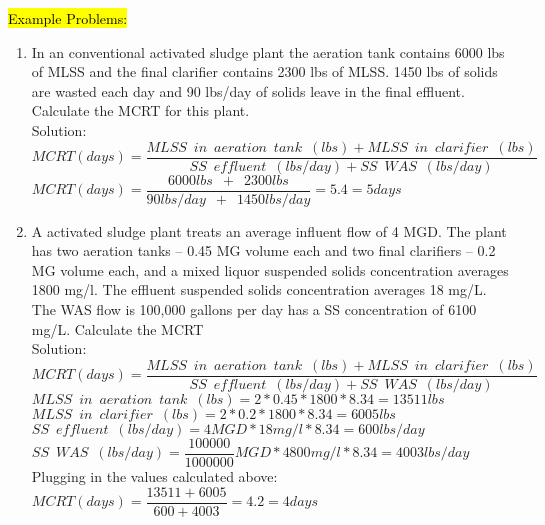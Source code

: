 \hl{Example Problems:}\\
\begin{enumerate}
\item In an conventional activated sludge plant  the aeration tank contains 6000 lbs of MLSS and the final clarifier contains 2300 lbs of MLSS. 1450 lbs of solids are wasted each day and 90 lbs/day of solids leave in the final effluent. Calculate the MCRT for this plant.\\
Solution:\\
\vspace{0.2cm} 
$MCRT (days) =  \dfrac{MLSS \enspace in \enspace aeration \enspace tank \enspace (lbs)+MLSS \enspace in \enspace clarifier \enspace (lbs)}{SS \enspace effluent \enspace (lbs/day)+SS \enspace WAS \enspace (lbs/day)}$\\
\vspace{0.2cm} 
$MCRT (days) =  \dfrac{6000lbs \enspace + \enspace 2300 lbs}{90lbs/day\enspace + \enspace 1450 lbs/day}=5.4=\boxed{5days}$\\
\vspace{0.3cm} 
\item A activated sludge plant treats an average influent flow of 4 MGD.  The plant has two  aeration tanks – 0.45 MG volume each and two final clarifiers – 0.2 MG volume each, and a mixed liquor suspended solids concentration averages  1800 mg/l.   The effluent suspended solids concentration averages 18 mg/L. The WAS flow is 100,000 gallons per day has a SS concentration of 6100 mg/L. Calculate the MCRT\\
Solution:\\
$MCRT (days) =  \dfrac{MLSS \enspace in \enspace aeration \enspace tank \enspace (lbs)+MLSS \enspace in \enspace clarifier \enspace (lbs)}{SS \enspace effluent \enspace (lbs/day)+SS \enspace WAS \enspace (lbs/day)}$\\
\vspace{0.3cm} 
$MLSS \enspace in \enspace aeration \enspace tank \enspace (lbs)=2*0.45*1800*8.34=13511lbs$\\
\vspace{0.3cm} 
$MLSS \enspace in \enspace clarifier \enspace (lbs)=2*0.2*1800*8.34=6005lbs$\\
\vspace{0.3cm} 
$SS \enspace effluent \enspace (lbs/day)=4MGD *18mg/l*8.34=600lbs/day$\\
\vspace{0.3cm} 
$SS \enspace WAS \enspace (lbs/day)=\dfrac{100000}{1000000}MGD *4800mg/l*8.34=4003lbs/day$\\
\vspace{0.3cm} 
Plugging in the values calculated above: $MCRT (days) =  \dfrac{13511+6005}{600+4003}=4.2=\boxed{4days}$\\
\end{enumerate}

